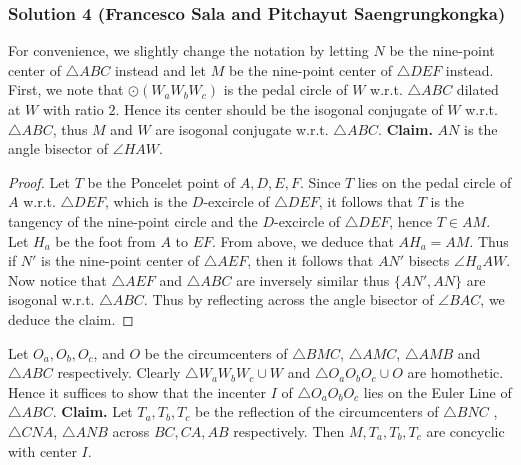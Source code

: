 \subsubsection{Solution 4 (Francesco Sala and Pitchayut Saengrungkongka)}
For convenience, we slightly change the notation by letting $N$ be the nine-point center of $\triangle ABC$ instead and let $M$ be the nine-point center of $\triangle DEF$ instead. 
\nl First, we note that $\odot(W_aW_bW_c)$ is the pedal circle of $W$ w.r.t. $\triangle ABC$ dilated at $W$ with ratio $2$. Hence its center should be the isogonal conjugate of $W$ w.r.t. $\triangle ABC$, thus $M$ and $W$ are isogonal conjugate w.r.t. $\triangle ABC$.\nl
\textbf{Claim.} $AN$ is the angle bisector of $\angle HAW$.
\begin{proof}
    Let $T$ be the Poncelet point of $A,D,E,F$. Since $T$ lies on the pedal circle of $A$ w.r.t. $\triangle DEF$, which is the $D$-excircle of $\triangle DEF$, it follows that $T$ is the tangency of the nine-point circle and the $D$-excircle of $\triangle DEF$, hence $T\in AM$.
    \nl Let $H_a$ be the foot from $A$ to $EF$. From above, we deduce that $AH_a = AM$. Thus if $N'$ is the nine-point center of $\triangle AEF$, then it follows that $AN'$ bisects $\angle H_aAW$. Now notice that $\triangle AEF$ and $\triangle ABC$ are inversely similar thus $\{AN', AN\}$ are isogonal w.r.t. $\triangle ABC$. Thus by reflecting across the angle bisector of $\angle BAC$, we deduce the claim.
\end{proof}
\noindent Let $O_a, O_b, O_c$, and $O$ be the circumcenters of $\triangle BMC$, $\triangle AMC$, $\triangle AMB$ and $\triangle ABC$ respectively. Clearly $\triangle W_aW_bW_c\cup W$ and $\triangle O_aO_bO_c\cup O$ are homothetic. Hence it suffices to show that the incenter $I$ of $\triangle O_aO_bO_c$ lies on the Euler Line of $\triangle ABC$.\nl
\textbf{Claim.} Let $T_a, T_b, T_c$ be the reflection of the circumcenters of $\triangle BNC$ ,$\triangle CNA$, $\triangle ANB$ across $BC, CA, AB$ respectively. Then $M, T_a, T_b, T_c$ are concyclic with center $I$.
